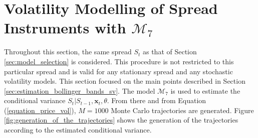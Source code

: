 \documentclass[11pt,a4,twosided,singlespacing,titlepagenumber=on]{scrreprt}
\numberwithin{equation}{chapter} %
\theoremstyle{remark}
\newcommand{\matr}[1]{\mathbf{#1}}
\begin{document}
\section{Volatility Modelling of Spread Instruments with $\mathcal{M}_7$}
Throughout this section, the same spread $S_t$ as that of Section \ref{sec:model_selection} is considered. This procedure is not restricted to this particular spread and is valid for any stationary spread and any stochastic volatility models. This section focused on the main points described in Section \ref{sec:estimation_bollinger_bands_sv}. The model $\mathcal{M}_7$ is used to estimate the conditional variance $S_t | S_{t-1}, \matr{x}_t, \theta$. From there and from Equation (\ref{equation_price_vol}), $M = 1000$ Monte Carlo trajectories are generated. Figure \ref{fig:generation_of_the_trajectories} shows the generation of the trajectories according to the estimated conditional variance.
\end{document}
